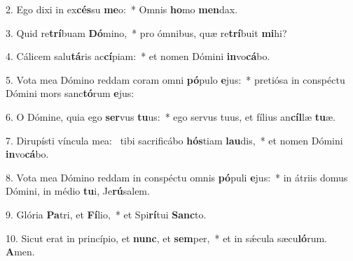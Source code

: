 2. Ego dixi in ex\textbf{cés}su \textbf{me}o:~*  Omnis \textbf{ho}mo \textbf{men}dax.\

3. Quid re\textbf{trí}buam \textbf{Dó}mino,~*  pro ómnibus, quæ re\textbf{trí}buit \textbf{mi}hi?\

4. Cálicem salu\textbf{tá}ris ac\textbf{cí}piam:~*  et nomen Dómini \textbf{in}vo\textbf{cá}bo.\

5. Vota mea Dómino reddam coram omni \textbf{pó}pulo \textbf{e}jus:~*  pretiósa in conspéctu Dómini mors sanc\textbf{tó}rum \textbf{e}jus:\

6. O Dómine, quia ego \textbf{ser}vus \textbf{tu}us:~*  ego servus tuus, et fílius an\textbf{cíl}læ \textbf{tu}æ.\

7. Dirupísti víncula mea: \dag\  tibi sacrificábo \textbf{hós}tiam \textbf{lau}dis,~*  et nomen Dómini \textbf{in}vo\textbf{cá}bo.\

8. Vota mea Dómino reddam in conspéctu omnis \textbf{pó}puli \textbf{e}jus:~*  in átriis domus Dómini, in médio \textbf{tu}i, Je\textbf{rú}salem.\

9. Glória \textbf{Pa}tri, et \textbf{Fí}lio,~*  et Spi\textbf{rí}tui \textbf{Sanc}to.\

10. Sicut erat in princípio, et \textbf{nunc}, et \textbf{sem}per,~*  et in sǽcula sæcu\textbf{ló}rum. \textbf{A}men.\

